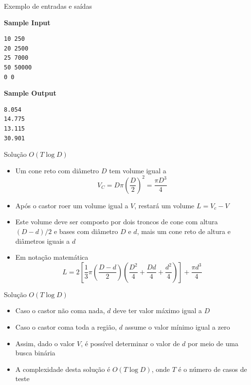 \begin{frame}[fragile]{Exemplo de entradas e saídas}

\begin{minipage}[t]{0.5\textwidth}
\textbf{Sample Input}
\begin{verbatim}
10 250
20 2500
25 7000
50 50000
0 0
\end{verbatim}
\end{minipage}
\begin{minipage}[t]{0.45\textwidth}
\textbf{Sample Output}
\begin{verbatim}
8.054
14.775
13.115
30.901
\end{verbatim}
\end{minipage}
\end{frame}

\begin{frame}[fragile]{Solução $O(T\log D)$}

    \begin{itemize}
        \item Um cone reto com diâmetro $D$ tem volume igual a
        \[
            V_C = D\pi\left(\frac{D}{2}\right)^2 = \frac{\pi D^3}{4}
        \]
        \pause

        \item Após o castor roer um volume igual a $V$, restará um volume $L = V_c - V$
        \pause

        \item Este volume deve ser composto por dois troncos de cone com altura $(D - d)/2$ e 
            bases com diâmetro $D$ e $d$, mais um cone reto de altura e diâmetros iguais a
            $d$
        \pause

        \item Em notação matemática
        \[
            L = 2\left[\frac{1}{3}\pi\left(\frac{D - d}{2}\right)\left(\frac{D^2}{4} + \frac{Dd}{4} + \frac{d^2}{4}\right)\right] + \frac{\pi d^3}{4}
        \]
    \end{itemize}

\end{frame}

\begin{frame}[fragile]{Solução $O(T\log D)$}

    \begin{itemize}
        \item Caso o castor não coma nada, $d$ deve ter valor máximo igual a $D$
        \pause

        \item Caso o castor coma toda a região, $d$ assume o valor mínimo igual a zero
        \pause

        \item Assim, dado o valor $V$, é possível determinar o valor de $d$ por meio de uma
            busca binária
        \pause

        \item A complexidade desta solução é $O(T\log D)$, onde $T$ é o número de casos de teste

    \end{itemize}

\end{frame}

